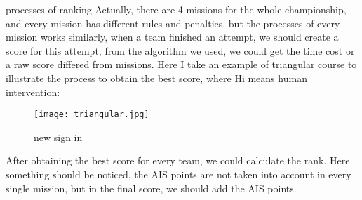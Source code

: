 \item{processes of ranking}
Actually, there are 4 missions for the whole championship, and every mission has different rules and penalties, but the processes of every mission works similarly, when a team finished an attempt, we should create a score for this attempt, from the algorithm we used, we could get the time cost or a raw score differed from missions. Here I take an example of triangular course to illustrate the process to obtain the best score, where Hi means human intervention:
\begin{figure}[h!]
\centering
\texttt{[image: triangular.jpg]}
\caption{new sign in }
\label{fig-sample}
\end{figure}
After obtaining the best score for every team, we could calculate the rank. Here something should be noticed, the AIS points are not taken into account in every single mission, but in the final score, we should add the AIS points.

